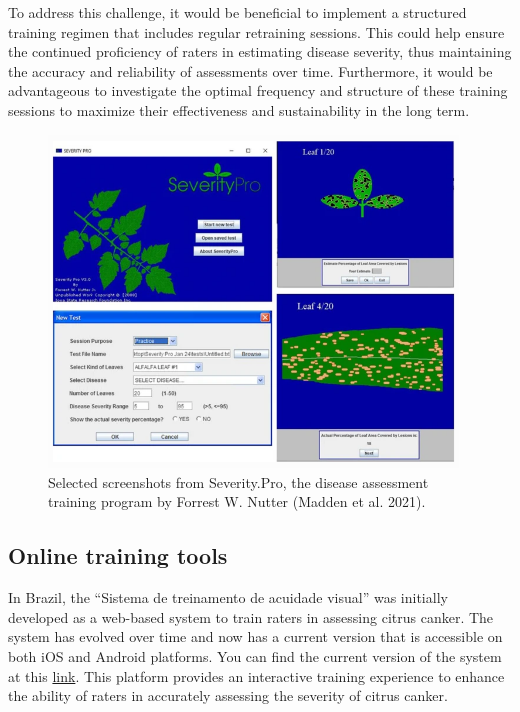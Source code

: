 \documentclass[
  letterpaper,
]{book}
\begin{document}
To address this challenge, it would be beneficial to implement a
structured training regimen that includes regular retraining sessions.
This could help ensure the continued proficiency of raters in estimating
disease severity, thus maintaining the accuracy and reliability of
assessments over time. Furthermore, it would be advantageous to
investigate the optimal frequency and structure of these training
sessions to maximize their effectiveness and sustainability in the long
term.

\begin{figure}

{\centering \includegraphics[width=4.28125in,height=\textheight]{imgs/severitypro.png}

}

\caption{\label{fig-severitypro}Selected screenshots from Severity.Pro,
the disease assessment training program by Forrest W. Nutter (Madden et
al. 2021).}

\end{figure}

\hypertarget{online-training-tools}{%
\subsection{Online training tools}\label{online-training-tools}}

In Brazil, the ``Sistema de treinamento de acuidade visual'' was
initially developed as a web-based system to train raters in assessing
citrus canker. The system has evolved over time and now has a current
version that is accessible on both iOS and Android platforms. You can
find the current version of the system at this
\href{http://sitav.pga.uem.br/index.php?menu=app}{link}. This platform
provides an interactive training experience to enhance the ability of
raters in accurately assessing the severity of citrus canker.
\end{document}
